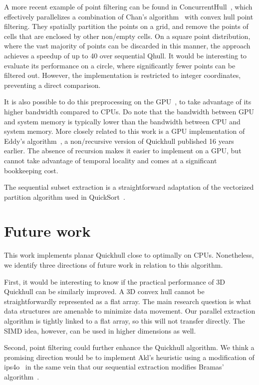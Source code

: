 A more recent example of point filtering can be found in ConcurrentHull~\cite{masnadi2020concurrent}, which effectively parallelizes a combination of Chan's algorithm~\cite{chan1996optimal} with convex hull point filtering.
They spatially partition the points on a grid, and remove the points of cells that are enclosed by other non\-/empty cells.
On a square point distribution, where the vast majority of points can be discarded in this manner, the approach achieves a speedup of up to \qty{40}{\times} over sequential Qhull.
It would be interesting to evaluate its performance on a circle, where significantly fewer points can be filtered out.
However, the implementation is restricted to integer coordinates, preventing a direct comparison.

It is also possible to do this preprocessing on the GPU~\cite{mei2016cuda}, to take advantage of its higher bandwidth compared to CPUs.
Do note that the bandwidth between GPU and system memory is typically lower than the bandwidth between CPU and system memory.
More closely related to this work is a GPU implementation of Eddy's algorithm~\cite{eddy1977convex}, a non\-/recursive version of Quickhull published 16 years earlier.
The absence of recursion makes it easier to implement on a GPU, but cannot take advantage of temporal locality and comes at a significant bookkeeping cost.

The sequential subset extraction is a straightforward adaptation of the vectorized partition algorithm used in QuickSort~\cite{bramas2017novel}.

\section{Future work}
This work implements planar Quickhull close to optimally on CPUs.
Nonetheless, we identify three directions of future work in relation to this algorithm.

First, it would be interesting to know if the practical performance of 3D Quickhull can be similarly improved.
A 3D convex hull cannot be straightforwardly represented as a flat array.
The main research question is what data structures are amenable to minimize data movement.
Our parallel extraction algorithm is tightly linked to a flat array, so this will not transfer directly.
The SIMD idea, however, can be used in higher dimensions as well.

Second, point filtering could further enhance the Quickhull algorithm.
We think a promising direction would be to implement Akl's heuristic using a modification of ips4o~\cite{axtmann2017inplace} in the same vein that our sequential extraction modifies Bramas' algorithm~\cite{bramas2017novel}.

